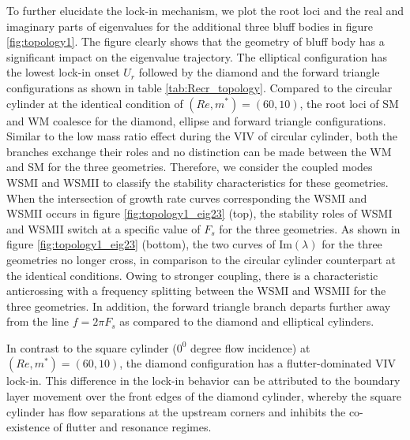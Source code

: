 \documentclass{jfm}
\begin{document}
To further elucidate the lock-in mechanism, we plot  
the root loci and the real and imaginary parts of eigenvalues 
for the additional three bluff bodies in figure \ref{fig:topology1}. 
The figure clearly shows that the geometry of bluff body has a significant impact 
on the eigenvalue trajectory. The elliptical configuration
has the lowest lock-in onset $U_r$ followed by the diamond 
and the forward triangle configurations as shown in table \ref{tab:Recr_topology}.
%
%
Compared to the circular cylinder at the identical condition 
of $(Re,m^*)=(60,10)$, the root loci of SM and WM coalesce 
for the diamond, ellipse and forward triangle configurations.
Similar to the low mass ratio effect during the VIV of circular cylinder, 
both the branches exchange their roles 
and no distinction can be made between the WM and SM for the three geometries.
Therefore, we consider the  coupled modes WSMI and WSMII 
to classify the stability characteristics for these geometries.
When the intersection of growth rate curves corresponding the WSMI and WSMII 
occurs in figure \ref{fig:topology1_eig23} (top), 
the stability roles of WSMI and WSMII switch at a specific value of $F_s$ for the 
three geometries.
As shown in figure \ref{fig:topology1_eig23} (bottom),
the two curves of Im$(\lambda)$ for the three geometries  no longer cross, 
in comparison to the circular cylinder counterpart at the identical conditions.
Owing to stronger coupling, there is 
a characteristic anticrossing with a frequency splitting between the WSMI and WSMII
for the three geometries.  
In addition, the forward triangle branch departs further away from the line $f=2\pi F_s$ 
as compared to the diamond and elliptical cylinders.

In contrast to the square cylinder ($0^0$ degree flow incidence) at $(Re,m^*)=(60,10)$, the diamond configuration 
has a flutter-dominated VIV lock-in. This difference in the lock-in behavior can be attributed 
to the boundary layer movement over the front edges of the diamond cylinder, whereby 
the square cylinder has flow separations at the upstream corners 
and inhibits the co-existence of flutter and resonance regimes.
\end{document}

